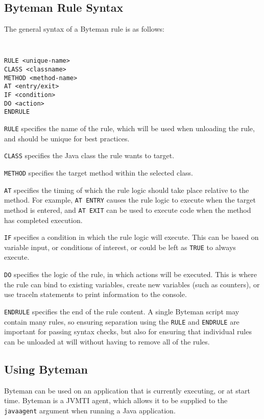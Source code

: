 \documentclass[letterpaper,twocolumn,10pt]{article}
\begin{document}
\subsection{Byteman Rule Syntax}

\noindent
The general syntax of a Byteman rule is as follows:

{\tt \small
\begin{verbatim}
RULE <unique-name>
CLASS <classname>
METHOD <method-name>
AT <entry/exit>
IF <condition>
DO <action>
ENDRULE
\end{verbatim}
}

{\tt RULE} specifies the name of the rule, which will be used when unloading the rule, and should be unique for best practices.

{\tt CLASS} specifies the Java class the rule wants to target.

{\tt METHOD} specifies the target method within the selected class.

{\tt AT} specifies the timing of which the rule logic should take place relative to the method. For example, {\tt AT ENTRY} causes the rule logic to execute when the target method is entered, and {\tt AT EXIT} can be used to execute code when the method has completed execution.

{\tt IF} specifies a condition in which the rule logic will execute. This can be based on variable input, or conditions of interest, or could be left as {\tt TRUE} to always execute.

{\tt DO} specifies the logic of the rule, in which actions will be executed. This is where the rule can bind to existing variables, create new variables (such as counters), or use traceln statements to print information to the console.

{\tt ENDRULE} specifies the end of the rule content. A single Byteman script may contain many rules, so ensuring separation using the {\tt RULE} and {\tt ENDRULE} are important for passing syntax checks, but also for ensuring that individual rules can be unloaded at will without having to remove all of the rules. 

\subsection{Using Byteman}

Byteman can be used on an application that is currently executing, or at start time. Byteman is a JVMTI agent, which allows it to be supplied to the {\tt javaagent} argument when running a Java application. 
\end{document}
